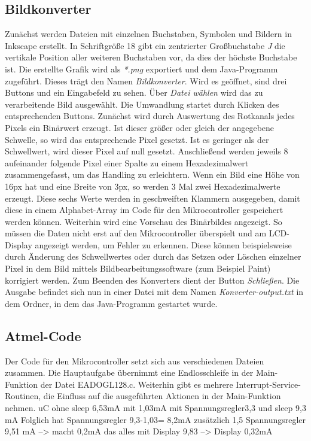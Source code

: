 \documentclass[journal, a4paper]{IEEEtran}
\begin{document}
	\subsection{Bildkonverter}
		\label{sc:Software:Subsc:Bildkonverter}
		Zunächst werden Dateien mit einzelnen Buchstaben, Symbolen und Bildern in Inkscape erstellt. In Schriftgröße 18 gibt ein zentrierter Großbuchstabe \textit{J} die vertikale Position aller weiteren Buchstaben vor, da dies der höchste Buchstabe ist. Die erstellte Grafik wird als \textit{*.png} exportiert und dem Java-Programm zugeführt. Dieses trägt den Namen \textit{Bildkonverter}. Wird es geöffnet, sind drei Buttons und ein Eingabefeld zu sehen. Über \textit{Datei wählen} wird das zu verarbeitende Bild ausgewählt. Die Umwandlung startet durch Klicken des entsprechenden Buttons. Zunächst wird durch Auswertung des Rotkanals jedes Pixels ein Binärwert erzeugt. Ist dieser größer oder gleich der angegebene Schwelle, so wird das entsprechende Pixel gesetzt. Ist es geringer als der Schwellwert, wird dieser Pixel auf null gesetzt. Anschließend werden jeweils 8 aufeinander folgende Pixel einer Spalte zu einem Hexadezimalwert zusammengefasst, um das Handling zu erleichtern. Wenn ein Bild eine Höhe von 16px hat und eine Breite von 3px, so werden 3 Mal zwei Hexadezimalwerte erzeugt. Diese sechs Werte werden in geschweiften Klammern ausgegeben, damit diese in einem Alphabet-Array im Code für den Mikrocontroller gespeichert werden können. Weiterhin wird eine Vorschau des Binärbildes angezeigt. So müssen die Daten nicht erst auf den Mikrocontroller überspielt und am LCD-Display angezeigt werden, um Fehler zu erkennen. Diese können beispielsweise durch Änderung des Schwellwertes oder durch das Setzen oder Löschen einzelner Pixel in dem Bild mittels Bildbearbeitungssoftware (zum Beispiel Paint) korrigiert werden. Zum Beenden des Konverters dient der Button \textit{Schließen}. Die Ausgabe befindet sich nun in einer Datei mit dem Namen \textit{Konverter-output.txt} in dem Ordner, in dem das Java-Programm gestartet wurde.\par
	\subsection{Atmel-Code}
	Der Code für den Mikrocontroller setzt sich aus verschiedenen Dateien zusammen. Die Hauptaufgabe übernimmt eine Endlosschleife in der Main-Funktion der Datei EADOGL128.c. Weiterhin gibt es mehrere Interrupt-Service-Routinen, die Einfluss auf die ausgeführten Aktionen in der Main-Funktion nehmen.
uC ohne sleep 6,53mA mit 1,03mA
mit Spannungsregler3,3 und sleep 9,3 mA
Folglich hat Spannungsregler 9,3-1,03= 8,2mA
zusätzlich 1,5 Spannungsregler 9,51 mA --> macht 0,2mA
das alles mit Display 9,83 --> Display 0,32mA
\end{document}
